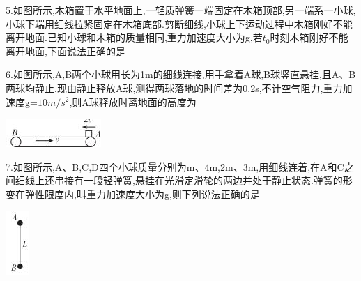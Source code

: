 \begin{solution}{4cm}

\end{solution}



\question[6] 5.如图所示,木箱置于水平地面上,一轻质弹簧一端固定在木箱顶部,另一端系一小球,小球下端用细线拉紧固定在木箱底部.剪断细线,小球上下运动过程中木箱刚好不能离开地面.已知小球和木箱的质量相同,重力加速度大小为g,若$t_0$时刻木箱刚好不能离开地面,下面说法正确的是

\begin{solution}{4cm}

\end{solution}



\question[6] 6.如图所示,A,B两个小球用长为1m的细线连接,用手拿着A球,B球竖直悬挂,且A、B两球均静止.现由静止释放A球,测得两球落地的时间差为0.2s,不计空气阻力,重力加速度g=$10m/s^2$,则A球释放时离地面的高度为
\begin{center}
\includegraphics[]{img/image6.jpeg}
\end{center}

\begin{solution}{4cm}

\end{solution}



\question[6] 7.如图所示,A、B,C,D四个小球质量分别为m、4m,2m、3m,用细线连着,在A和C之间细线上还串接有一段轻弹簧,悬挂在光滑定滑轮的两边并处于静止状态.弹簧的形变在弹性限度内,叫重力加速度大小为g,则下列说法正确的是
\begin{center}
\includegraphics[]{img/image7.jpeg}
\end{center}

\begin{solution}{4cm}

\end{solution}



